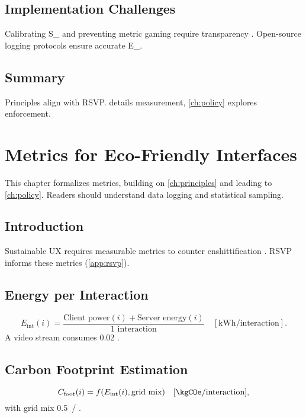 \documentclass[openany]{book}
\newcommand{\Eint}{E_{\mathrm{int}}} %
\newcommand{\Cfoot}{C_{\mathrm{foot}}} %
\newcommand{\SUX}{S_{\mathrm{UX}}} %
\newcommand{\kWh}{\mathrm{kWh}}
\begin{document}
\section{Implementation Challenges}
\label{sec:principles-challenges}
Calibrating \SUX{} and preventing metric gaming require transparency \citep{colak2024}. Open-source logging protocols ensure accurate \Eint{}.

\section{Summary}
Principles align with RSVP.  details measurement, \cref{ch:policy} explores enforcement.

\chapter{Metrics for Eco-Friendly Interfaces}
\label{ch:metrics}

This chapter formalizes metrics, building on \cref{ch:principles} and leading to \cref{ch:policy}. Readers should understand data logging and statistical sampling.

\section{Introduction}
\label{sec:metrics-intro}
Sustainable UX requires measurable metrics to counter enshittification \citep{prigogine1984,doctorow2022}. RSVP informs these metrics (\cref{app:rsvp}).

\section{Energy per Interaction}
\label{sec:metrics-energy}
\begin{equation}
\label{eq:Eint}
\Eint(i) = \frac{\text{Client power}(i) + \text{Server energy}(i)}{\text{1 interaction}} \quad [\kWh/\text{interaction}].
\end{equation}
A video stream consumes \SI{0.02}{\kWh} \citep{extentia2024}.

\section{Carbon Footprint Estimation}
\label{sec:metrics-carbon}
\begin{equation}
\label{eq:Cfoot}
\Cfoot(i) = f(\Eint(i), \text{grid mix}) \quad [\kgCOe/\text{interaction}],
\end{equation}
with grid mix \SI{0.5}{\kgCOe/\kWh} \citep{colak2024}.
\end{document}
